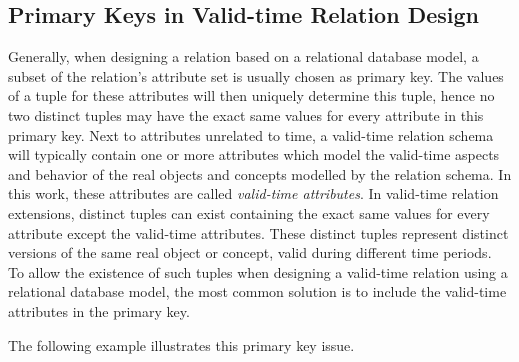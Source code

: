 \subsection{\label{subsubsec:primary-key}Primary Keys in Valid-time Relation Design}
Generally, when designing a relation based on a relational database model, a subset of the relation's attribute set is usually chosen as primary key. The values of a tuple for these attributes will then uniquely determine this tuple, hence no two distinct tuples may have the exact same values for every attribute in this primary key. Next to attributes unrelated to time, a valid-time relation schema will typically contain one or more attributes which model the valid-time aspects and behavior of the real objects and concepts modelled by the relation schema. In this work, these attributes are called \emph{valid-time attributes}. In valid-time relation extensions, distinct tuples can exist containing the exact same values for every attribute except the valid-time attributes. These distinct tuples represent distinct versions of the same real object or concept, valid during different time periods. To allow the existence of such tuples when designing a valid-time relation using a relational database model, the most common solution is to include the valid-time attributes in the primary key.

The following example illustrates this primary key issue.

